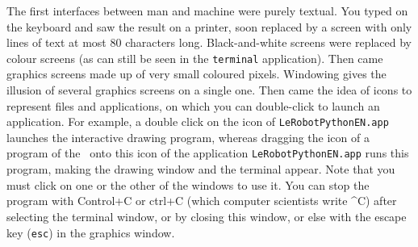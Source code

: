 {\begin{minipage}{\myparboxwidth}
The first interfaces between man and machine were purely textual. You typed on
the keyboard and saw the result on a printer, soon replaced by a screen with only
lines of text at most 80 characters long. Black-and-white screens were
replaced by colour screens (as can still be seen in the \texttt{terminal} application).
Then came graphics screens made up of very small coloured pixels.
Windowing gives the illusion of several graphics screens on a single one. Then came
the idea of icons to represent files and applications, on which you can
double-click to launch an application. For example, a double click on the icon of
\texttt{LeRobotPythonEN.app} launches the interactive drawing program, whereas dragging the icon
of a program of the \robot\ onto this icon of the application \texttt{LeRobotPythonEN.app} runs this program,
making the drawing window and the terminal appear. Note that you must click on
one or the other of the windows to use it. You can stop the program with Control+C or
ctrl+C (which computer scientists write \^{}C) after selecting the terminal window, or by closing this window, or else with the escape key (\texttt{esc}) in the graphics window.

\end{minipage}
}

